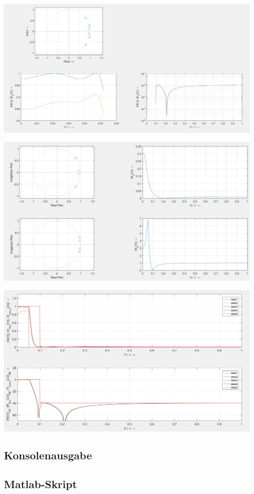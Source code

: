 \begin{center}
\includegraphics[scale=0.5]{UE02_3_Direct.PNG}
\end{center}

\begin{center}
\includegraphics[scale=0.5]{UE02_3_Cascade_2.PNG}
\end{center}

\begin{center}
\includegraphics[scale=0.5]{UE02_3_16Bit.PNG}
\end{center}

\newpage

\subsection{Konsolenausgabe}


\newpage

\subsection{Matlab-Skript}


